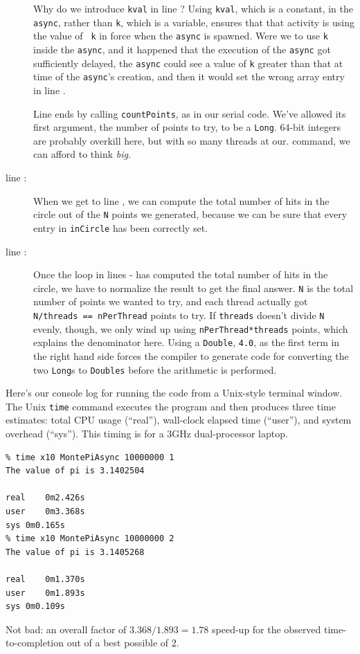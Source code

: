 \begin{description}
Why do we introduce {\tt kval} in line ?
Using {\tt kval}, which is a constant,  in
the {\tt async}, rather than {\tt k}, which is a
variable, ensures that that activity is using the value of {\tt
k} in force when the {\tt async} is spawned.  Were we to use {\tt k} inside the
{\tt async}, and it happened that the execution of the {\tt async} got
sufficiently delayed, the {\tt async} could see a value of {\tt k} greater than
that at time of the {\tt async}'s creation, and then it would set the wrong
array entry in line .

Line    ends by calling {\tt countPoints}, as in our serial code.
We've allowed its first argument, the number of points to try, to be a {\tt Long}.
64-bit integers are probably overkill here, but with so many threads at our.
command, we can afford to think {\em big}.

\item[line \xlref{mpia-for2}{15}: ]
When we get to line , we can compute the total number
of hits in the circle out of the {\tt N} points we generated, because we can be sure that every entry in {\tt inCircle} has been correctly set.  

\item[line \xlref{mpia-pi}{20}: ]
Once the loop in lines -
has computed the total number of hits in the circle, 
we have to normalize the result to get the final answer.  
{\tt N} is the total number of points
we wanted to try, and each thread actually got {\tt N/threads == nPerThread}
 points to try.
If {\tt threads} doesn't divide {\tt N} evenly, though, we only wind up using
{\tt nPerThread*threads} points, which explains the denominator here.
Using a {\tt Double}, {\tt 4.0}, as the first term in the right hand side forces
the compiler to generate code for converting the two {\tt Long}s to {\tt Doubles} before
the arithmetic is performed.
\end{description}

Here's our console log for running the code from a Unix-style terminal window.
The Unix {\tt time} command
executes the program and then produces three time estimates: total CPU usage (``real''),
wall-clock elapsed time (``user''), and system overhead (``sys'').
This timing is for a 3GHz dual-processor laptop.   
\begin{verbatim}
% time x10 MontePiAsync 10000000 1
The value of pi is 3.1402504

real	0m2.426s
user	0m3.368s
sys	0m0.165s
% time x10 MontePiAsync 10000000 2
The value of pi is 3.1405268

real	0m1.370s
user	0m1.893s
sys	0m0.109s
\end{verbatim}
Not bad: an overall factor of  $3.368/1.893 = 1.78$ speed-up for the observed time-to-completion
out of a best possible of $2$.  

